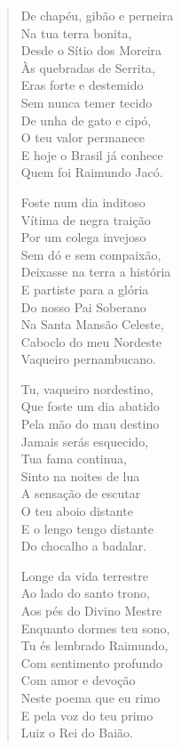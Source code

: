 \begin{verse}
De chapéu, gibão e perneira\\
Na tua terra bonita,\\
Desde o Sítio dos Moreira\\
Às quebradas de Serrita,\\
Eras forte e destemido\\
Sem nunca temer tecido\\
De unha de gato e cipó,\\
O teu valor permanece\\
E hoje o Brasil já conhece\\
Quem foi Raimundo Jacó.

Foste num dia inditoso\\
Vítima de negra traição\\
Por um colega invejoso\\
Sem dó e sem compaixão,\\
Deixasse na terra a história\\
E partiste para a glória\\
Do nosso Pai Soberano\\
Na Santa Mansão Celeste,\\
Caboclo do meu Nordeste\\
Vaqueiro pernambucano.

Tu, vaqueiro nordestino,\\
Que foste um dia abatido\\
Pela mão do mau destino\\
Jamais serás esquecido,\\
Tua fama continua,\\
Sinto na noites de lua\\
A sensação de escutar\\
O teu aboio distante\\
E o lengo tengo distante\\
Do chocalho a badalar.

Longe da vida terrestre\\
Ao lado do santo trono,\\
Aos pés do Divino Mestre\\
Enquanto dormes teu sono,\\
Tu és lembrado Raimundo,\\
Com sentimento profundo\\
Com amor e devoção\\
Neste poema que eu rimo\\
E pela voz do teu primo\\
Luiz o Rei do Baião.
\end{verse}

